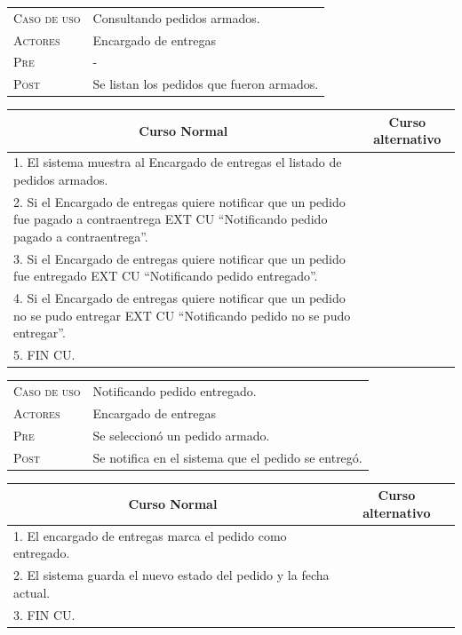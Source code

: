 \newpage

\begin{tabular}{p{} p{}}
    \textsc{Caso de uso} & Consultando pedidos armados. \\
    \textsc{Actores} & Encargado de entregas \\
    \textsc{Pre} & - \\
    \textsc{Post} & Se listan los pedidos que fueron armados. \\
\end{tabular}

\begin{center}
\begin{tabular}{|p{}|p{}|}
    \hline
    \multicolumn{1}{|c|}{Curso Normal} &
    \multicolumn{1}{|c|}{Curso alternativo} \\
    \hline
    1. El sistema muestra al Encargado de entregas el listado de pedidos
    armados. & \\
    2. Si el Encargado de entregas quiere notificar que un pedido fue pagado a
    contraentrega EXT CU ``Notificando pedido pagado a contraentrega''. & \\
    3. Si el Encargado de entregas quiere notificar que un pedido fue
    entregado EXT CU ``Notificando pedido entregado''. & \\
    4. Si el Encargado de entregas quiere notificar que un pedido no se pudo
    entregar EXT CU ``Notificando pedido no se pudo entregar''. & \\
    5. FIN CU. & \\
    \hline
\end{tabular}
\end{center}

\begin{tabular}{p{} p{}}
    \textsc{Caso de uso} & Notificando pedido entregado. \\
    \textsc{Actores} & Encargado de entregas \\
    \textsc{Pre} & Se seleccionó un pedido armado. \\
    \textsc{Post} & Se notifica en el sistema que el pedido se entregó. \\
\end{tabular}

\begin{center}
\begin{tabular}{|p{}|p{}|}
    \hline
    \multicolumn{1}{|c|}{Curso Normal} &
    \multicolumn{1}{|c|}{Curso alternativo} \\
    \hline
    1. El encargado de entregas marca el pedido como entregado. & \\
    2. El sistema guarda el nuevo estado del pedido y la fecha actual. & \\
    3. FIN CU. & \\
    \hline
\end{tabular}
\end{center}


